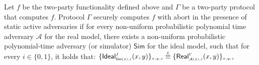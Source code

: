 %
%
%
% 
% 
% 
 
\begin{definition}\label{def::MPC-active-adv}
Let $f$ be the two-party functionality defined above and $\Gamma$ be a two-party protocol that computes $f$.   Protocol $\Gamma$ securely computes $f$ with abort in the presence of static active adversaries if for every non-uniform probabilistic polynomial time adversary $\mathcal{A}$ for the real model, there exists a non-uniform probabilistic polynomial-time adversary (or simulator) $\mathsf{Sim}$ for the ideal model, such that for every $i\in \{0,1\}$, it holds that: 
%
$
\{\mathsf {Ideal}^{\scriptscriptstyle f}_{\scriptscriptstyle \mathsf{Sim}(z), i}(x,y)\}_{\scriptscriptstyle x,y,z}\stackrel{c}{\equiv} \{\mathsf{Real}_{\scriptscriptstyle \mathcal{A}(z), i}^{\scriptscriptstyle \Gamma}(x,y) \}_{\scriptscriptstyle x,y,z}
$
%
\end{definition}
 
